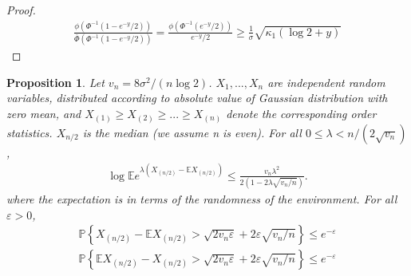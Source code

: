 \documentclass{article}
\theoremstyle{plain}
\newtheorem{prop}{Proposition}
\begin{document}
\begin{proof}
\begin{align}
    \frac{\phi\left(\Phi^{-1}\left(1-e^{-y} / 2\right)\right)}{\overline{\Phi}\left(\Phi^{-1}\left(1-e^{-y} / 2\right)\right)}=\frac{\phi\left(\Phi^{-1}\left(e^{-y} / 2\right)\right)}{e^{-y} / 2} \geq \frac{1}{\sigma} \sqrt{\kappa_{1}(\log 2+y)}
\end{align}
\end{proof}


\begin{prop}
\label{prop 4.6}
Let $v_{n}=8 \sigma^2 /(n \log 2)$. $X_1, ..., X_n$ are independent random variables, distributed according to absolute value of Gaussian distribution with zero mean, and $X_{(1)} \geq X_{(2)} \geq ... \geq X_{(n)}$ denote the corresponding order statistics. $X_{n/2}$ is the median (we assume n is even). For all $0 \leq \lambda<n /\left(2 \sqrt{v_{n}}\right)$, 
\begin{align}
    \label{inequality Bernstein with log for normal}
    \log \mathbb{E}e^{\lambda\left(X_{(n / 2)}-\mathbb{E} X_{(n / 2)}\right)} \leq \frac{v_{n} \lambda^{2}}{2\left(1-2 \lambda \sqrt{v_{n} / n}\right)}.
\end{align}
where the expectation is in terms of the randomness of the environment. For all $\varepsilon > 0$,
\begin{align} 
    \label{inequality Bernstein upper bound for normal}
    \mathbb{P}\left\{X_{(n / 2)}-\mathbb{E} X_{(n / 2)}>\sqrt{2 v_{n} \varepsilon}+2 \varepsilon \sqrt{v_{n} / n}\right\} \leq e^{-\varepsilon}\\
    \label{inequality Bernstein lower bound for normal}
    \mathbb{P}\left\{\mathbb{E} X_{(n / 2)} - X_{(n / 2)}>\sqrt{2 v_{n} \varepsilon}+2 \varepsilon \sqrt{v_{n} / n}\right\} \leq e^{-\varepsilon}
\end{align}
\end{prop}
\end{document}
